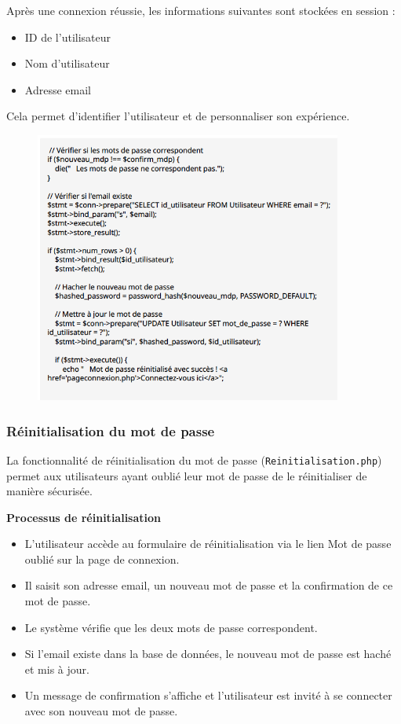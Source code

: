 \documentclass[a4paper,12pt]{article}
\begin{document}
Après une connexion réussie, les informations suivantes sont stockées en session :
\begin{itemize}
  \item ID de l'utilisateur
  \item Nom d'utilisateur
  \item Adresse email
\end{itemize}

Cela permet d’identifier l’utilisateur et de personnaliser son expérience.

\begin{figure}[H]
  \centering
  \includegraphics[width=0.9\textwidth]{capture4.png}
\end{figure}
\subsubsection{Réinitialisation du mot de passe}
La fonctionnalité de réinitialisation du mot de passe (\texttt{Reinitialisation.php}) permet aux utilisateurs ayant oublié leur mot de passe de le réinitialiser de manière sécurisée.

\textbf{Processus de réinitialisation}
\begin{itemize}
  \item L'utilisateur accède au formulaire de réinitialisation via le lien \og Mot de passe oublié \fg{} sur la page de connexion.
  \item Il saisit son adresse email, un nouveau mot de passe et la confirmation de ce mot de passe.
  \item Le système vérifie que les deux mots de passe correspondent.
  \item Si l'email existe dans la base de données, le nouveau mot de passe est haché et mis à jour.
  \item Un message de confirmation s'affiche et l'utilisateur est invité à se connecter avec son nouveau mot de passe.
\end{itemize}
\end{document}
